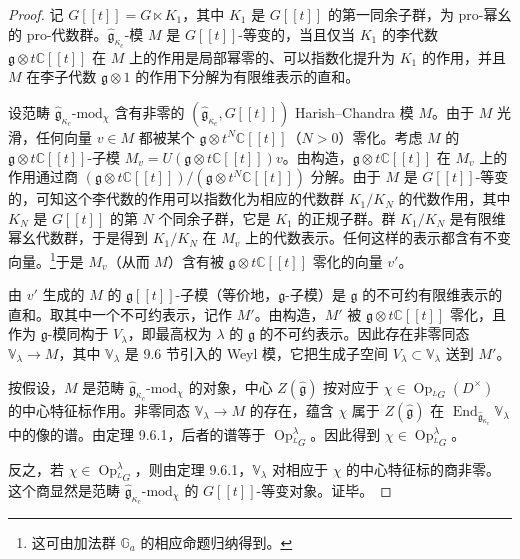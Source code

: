 \begin{proof}
    记 $G[[t]]=G\ltimes K_1$，其中 $K_1$ 是 $G[[t]]$ 的第一同余子群，为 pro-幂幺的 pro-代数群。$\hat{\mathfrak{g}}_{\kappa_c}$-模 $M$ 是 $G[[t]]$-等变的，当且仅当 $K_1$ 的李代数 $\mathfrak{g}\otimes t\mathbb{C}[[t]]$ 在 $M$ 上的作用是局部幂零的、可以指数化提升为 $K_1$ 的作用，并且 $M$ 在李子代数 $\mathfrak{g}\otimes1$ 的作用下分解为有限维表示的直和。

    设范畴 $\hat{\mathfrak{g}}_{\kappa_c}\text{-mod}_\chi$ 含有非零的 $(\hat{\mathfrak{g}}_{\kappa_c},G[[t]])$ Harish--Chandra 模 $M$。由于 $M$ 光滑，任何向量 $v\in M$ 都被某个 $\mathfrak{g}\otimes t^N\mathbb{C}[[t]]$（$N>0$）零化。考虑 $M$ 的 $\mathfrak{g}\otimes t\mathbb{C}[[t]]$-子模 $M_v=U(\mathfrak{g}\otimes t\mathbb{C}[[t]])v$。由构造，$\mathfrak{g}\otimes t\mathbb{C}[[t]]$ 在 $M_v$ 上的作用通过商 $(\mathfrak{g}\otimes t\mathbb{C}[[t]])/(\mathfrak{g}\otimes t^N\mathbb{C}[[t]])$ 分解。由于 $M$ 是 $G[[t]]$-等变的，可知这个李代数的作用可以指数化为相应的代数群 $K_1/K_N$ 的代数作用，其中 $K_N$ 是 $G[[t]]$ 的第 $N$ 个同余子群，它是 $K_1$ 的正规子群。群 $K_1/K_N$ 是有限维幂幺代数群，于是得到 $K_1/K_N$ 在 $M_v$ 上的代数表示。任何这样的表示都含有不变向量。\footnote{这可由加法群 $\mathbb{G}_a$ 的相应命题归纳得到。}于是 $M_v$（从而 $M$）含有被 $\mathfrak{g}\otimes t\mathbb{C}[[t]]$ 零化的向量 $v'$。

    由 $v'$ 生成的 $M$ 的 $\mathfrak{g}[[t]]$-子模（等价地，$\mathfrak{g}$-子模）是 $\mathfrak{g}$ 的不可约有限维表示的直和。取其中一个不可约表示，记作 $M'$。由构造，$M'$ 被 $\mathfrak{g}\otimes t\mathbb{C}[[t]]$ 零化，且作为 $\mathfrak{g}$-模同构于 $V_\lambda$，即最高权为 $\lambda$ 的 $\mathfrak{g}$ 的不可约表示。因此存在非零同态 $\mathbb{V}_\lambda\to M$，其中 $\mathbb{V}_\lambda$ 是 9.6 节引入的 Weyl 模，它把生成子空间 $V_\lambda\subset\mathbb{V}_\lambda$ 送到 $M'$。

    按假设，$M$ 是范畴 $\hat{\mathfrak{g}}_{\kappa_c}\text{-mod}_\chi$ 的对象，中心 $Z(\hat{\mathfrak{g}})$ 按对应于 $\chi\in\operatorname{Op}_{{}^LG}(D^\times)$ 的中心特征标作用。非零同态 $\mathbb{V}_\lambda\to M$ 的存在，蕴含 $\chi$ 属于 $Z(\hat{\mathfrak{g}})$ 在 $\operatorname{End}_{\hat{\mathfrak{g}}_{\kappa_c}}\mathbb{V}_\lambda$ 中的像的谱。由定理 9.6.1，后者的谱等于 $\operatorname{Op}^\lambda_{{}^LG}$。因此得到 $\chi\in\operatorname{Op}^\lambda_{{}^LG}$。

    反之，若 $\chi\in\operatorname{Op}^\lambda_{{}^LG}$，则由定理 9.6.1，$\mathbb{V}_\lambda$ 对相应于 $\chi$ 的中心特征标的商非零。这个商显然是范畴 $\hat{\mathfrak{g}}_{\kappa_c}\text{-mod}_\chi$ 的 $G[[t]]$-等变对象。证毕。
\end{proof}


